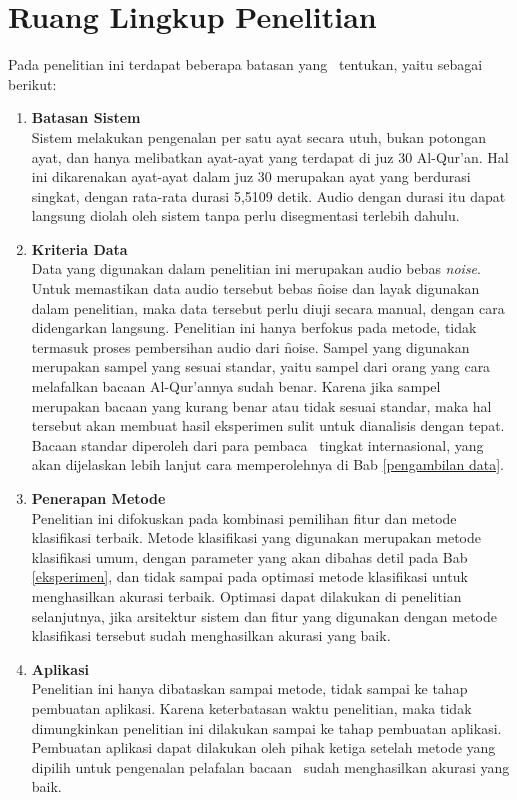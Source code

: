 \section{Ruang Lingkup Penelitian}
Pada penelitian ini terdapat beberapa batasan yang \saya~tentukan, yaitu sebagai berikut:
\begin{enumerate}
\item{\bf Batasan Sistem}\\
Sistem melakukan pengenalan per satu ayat secara utuh, bukan potongan ayat, dan hanya melibatkan ayat-ayat yang terdapat di juz 30 Al-Qur'an. Hal ini dikarenakan ayat-ayat dalam juz 30 merupakan ayat yang berdurasi singkat, dengan rata-rata durasi 5,5109 detik. Audio dengan durasi itu dapat langsung diolah oleh sistem tanpa perlu disegmentasi terlebih dahulu.
	
\item{\bf Kriteria Data}\\
Data yang digunakan dalam penelitian ini merupakan audio bebas \textit{noise}. Untuk memastikan data audio tersebut bebas \f{noise} dan layak digunakan dalam penelitian, maka data tersebut perlu diuji secara manual, dengan cara didengarkan langsung. Penelitian ini hanya berfokus pada metode, tidak termasuk proses pembersihan audio dari \f{noise}. Sampel yang digunakan merupakan sampel yang sesuai standar, yaitu sampel dari orang yang cara melafalkan bacaan Al-Qur'annya sudah benar. Karena jika sampel merupakan bacaan yang kurang benar atau tidak sesuai standar, maka hal tersebut akan membuat hasil eksperimen sulit untuk dianalisis dengan tepat. Bacaan standar diperoleh dari para pembaca \quran~tingkat internasional, yang akan dijelaskan lebih lanjut cara memperolehnya di Bab \ref{pengambilan data}.
	
\item{\bf Penerapan Metode}\\
Penelitian ini difokuskan pada kombinasi pemilihan fitur dan metode klasifikasi terbaik. Metode klasifikasi yang digunakan merupakan metode klasifikasi umum, dengan parameter yang akan dibahas detil pada Bab \ref{eksperimen}, dan tidak sampai pada optimasi metode klasifikasi untuk menghasilkan akurasi terbaik. Optimasi dapat dilakukan di penelitian selanjutnya, jika arsitektur sistem dan fitur yang digunakan dengan metode klasifikasi tersebut sudah menghasilkan akurasi yang baik.
	
\item{\bf Aplikasi}\\
Penelitian ini hanya dibataskan sampai metode, tidak sampai ke tahap pembuatan aplikasi. Karena keterbatasan waktu penelitian, maka tidak dimungkinkan penelitian ini dilakukan sampai ke tahap pembuatan aplikasi. Pembuatan aplikasi dapat dilakukan oleh pihak ketiga setelah metode yang dipilih untuk pengenalan pelafalan bacaan \quran~sudah menghasilkan akurasi yang baik.
\end{enumerate}

